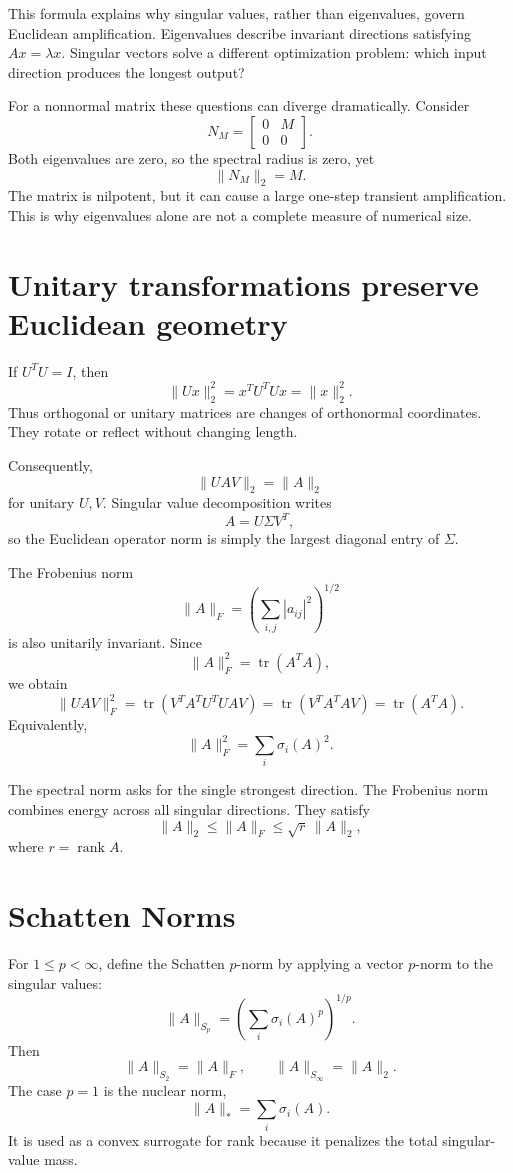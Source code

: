 This formula explains why singular values, rather than eigenvalues, govern Euclidean amplification.  Eigenvalues describe invariant directions satisfying \(Ax=\lambda x\).  Singular vectors solve a different optimization problem: which input direction produces the longest output?

For a nonnormal matrix these questions can diverge dramatically.  Consider
\[
  N_M=
  \begin{bmatrix}
    0&M\\
    0&0
  \end{bmatrix}.
\]
Both eigenvalues are zero, so the spectral radius is zero, yet
\[
  \|N_M\|_2=M.
\]
The matrix is nilpotent, but it can cause a large one-step transient amplification.  This is why eigenvalues alone are not a complete measure of numerical size.

\section{Unitary transformations preserve Euclidean geometry}

If \(U^TU=I\), then
\[
  \|Ux\|_2^2=x^TU^TUx=\|x\|_2^2.
\]
Thus orthogonal or unitary matrices are changes of orthonormal coordinates.  They rotate or reflect without changing length.

Consequently,
\[
  \|UAV\|_2=\|A\|_2
\]
for unitary \(U,V\).  Singular value decomposition writes
\[
  A=U\Sigma V^T,
\]
so the Euclidean operator norm is simply the largest diagonal entry of \(\Sigma\).

The Frobenius norm
\[
  \|A\|_F=\left(\sum_{i,j}|a_{ij}|^2\right)^{1/2}
\]
is also unitarily invariant.  Since
\[
  \|A\|_F^2=\operatorname{tr}(A^TA),
\]
we obtain
\[
  \|UAV\|_F^2
  =\operatorname{tr}(V^TA^TU^TUAV)
  =\operatorname{tr}(V^TA^TAV)
  =\operatorname{tr}(A^TA).
\]
Equivalently,
\[
  \|A\|_F^2=\sum_i\sigma_i(A)^2.
\]

The spectral norm asks for the single strongest direction.  The Frobenius norm combines energy across all singular directions.  They satisfy
\[
  \|A\|_2\le \|A\|_F\le \sqrt{r}\,\|A\|_2,
\]
where \(r=\operatorname{rank}A\).

\section{Schatten Norms}

For \(1\le p<\infty\), define the Schatten \(p\)-norm by applying a vector \(p\)-norm to the singular values:
\[
  \|A\|_{S_p}
  =\left(\sum_i\sigma_i(A)^p\right)^{1/p}.
\]
Then
\[
  \|A\|_{S_2}=\|A\|_F,
  \qquad
  \|A\|_{S_\infty}=\|A\|_2.
\]
The case \(p=1\) is the nuclear norm,
\[
  \|A\|_*=\sum_i\sigma_i(A).
\]
It is used as a convex surrogate for rank because it penalizes the total singular-value mass.


